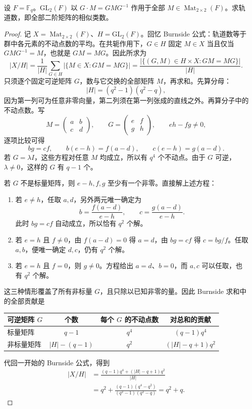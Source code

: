 \documentclass[lang=cn,a4paper,fontset=none,zihao=false,10pt,openany,twoside]{beautybook}
\numberwithin{algorithm}{chapter}
\begin{document}
\begin{example}[有限域上的二阶矩阵相似类]\label{ex:matrix-similarity-count}
设 $F=\mathbb F_q$。$\mathrm{GL}_2(F)$ 以 $G\cdot M=GMG^{-1}$ 作用于全部 $M\in\operatorname{Mat}_{2\times2}(F)$。求轨道数，即全部二阶矩阵的相似类数。
\end{example}
\begin{proof}
记 $X=\operatorname{Mat}_{2\times2}(F)$、$H=\mathrm{GL}_2(F)$。回忆 Burnside 公式：轨道数等于群中各元素的不动点数的平均。在共轭作用下，$G\in H$ 固定 $M\in X$ 当且仅当 $GMG^{-1}=M$，也就是 $GM=MG$。因此所求为
\[
 |X/H|=\frac1{|H|}\sum_{G\in H}|\{M\in X:GM=MG\}|
 =\frac{|\{(G,M)\in H\times X:GM=MG\}|}{|H|}.
\]
只须逐个固定可逆矩阵 $G$，数与它交换的全部矩阵 $M$，再求和。先算分母：
\[
 |H|=(q^2-1)(q^2-q),
\]
因为第一列可为任意非零向量，第二列须在第一列张成的直线之外。再算分子中的不动点数。写
\[
 M=\begin{pmatrix}a&b\\c&d\end{pmatrix},\qquad
 G=\begin{pmatrix}e&f\\g&h\end{pmatrix},\qquad eh-fg\ne0,
\]
逐项比较可得
\[
 bg=cf,\qquad b(e-h)=f(a-d),\qquad c(e-h)=g(a-d).
\]
若 $G=\lambda I$，这些方程对任意 $M$ 均成立，所以有 $q^4$ 个不动点。由于 $G$ 可逆，$\lambda\ne0$，这样的 $G$ 有 $q-1$ 个。

若 $G$ 不是标量矩阵，则 $e-h,f,g$ 至少有一个非零。直接解上述方程：
\begin{enumerate}[(1)]
\item 若 $e\ne h$，任取 $a,d$，另外两元唯一确定为
\[
 b=\frac{f(a-d)}{e-h},\qquad c=\frac{g(a-d)}{e-h}.
\]
此时 $bg=cf$ 自动成立，所以恰有 $q^2$ 个解。
\item 若 $e=h$ 且 $f\ne0$，由 $f(a-d)=0$ 得 $a=d$，由 $bg=cf$ 得 $c=bg/f$。任取 $a,b$，便唯一确定 $d,c$，仍有 $q^2$ 个解。
\item 若 $e=h$ 且 $f=0$，则 $g\ne0$。方程给出 $a=d$、$b=0$，而 $a,c$ 可以任取，也有 $q^2$ 个解。
\end{enumerate}
这三种情形覆盖了所有非标量 $G$，且只除以已知非零的量。因此 Burnside 求和中的全部贡献是
\begin{center}
\begin{tabular}{@{}lccc@{}}
\toprule
可逆矩阵 $G$ & 个数 & 每个 $G$ 的不动点数 & 对总和的贡献\\
\midrule
标量矩阵 & $q-1$ & $q^4$ & $(q-1)q^4$\\
非标量矩阵 & $|H|-(q-1)$ & $q^2$ & $(|H|-q+1)q^2$\\
\bottomrule
\end{tabular}
\end{center}
代回一开始的 Burnside 公式，得到
\[
 \begin{aligned}
 |X/H|
 &=\frac{(q-1)q^4+(|H|-q+1)q^2}{|H|}\\
 &=q^2+\frac{(q-1)(q^4-q^2)}{(q^2-1)(q^2-q)}
 =q^2+q.
 \end{aligned}
\]
\end{proof}
\end{document}
